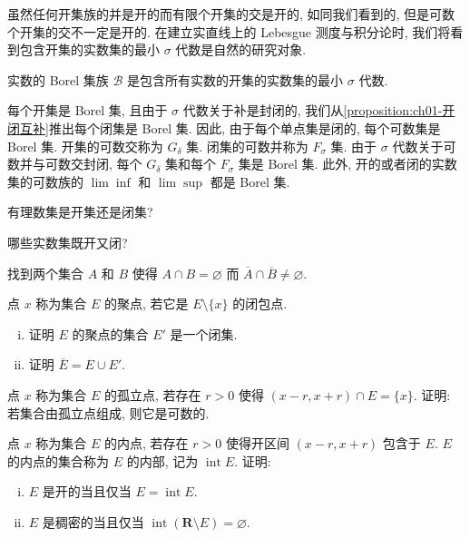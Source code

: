 \documentclass[../../main.tex]{subfiles}
\begin{document}
虽然任何开集族的并是开的而有限个开集的交是开的, 如同我们看到的, 但是可数个开集的交不一定是开的. 在建立实直线上的 Lebesgue 测度与积分论时, 我们将看到包含开集的实数集的最小 $\sigma$ 代数是自然的研究对象.

\begin{definition}[Borel 集族]\label{definition:ch01-Borel集}
实数的 Borel 集族 $\mathcal{B}$ 是包含所有实数的开集的实数集的最小 $\sigma$ 代数.
\end{definition}

每个开集是 Borel 集, 且由于 $\sigma$ 代数关于补是封闭的, 我们从\cref{proposition:ch01-开闭互补}推出每个闭集是 Borel 集. 因此, 由于每个单点集是闭的, 每个可数集是 Borel 集. 开集的可数交称为 $G_{\delta}$ 集. 闭集的可数并称为 $F_{\sigma}$ 集. 由于 $\sigma$ 代数关于可数并与可数交封闭, 每个 $G_{\delta}$ 集和每个 $F_{\sigma}$ 集是 Borel 集. 此外, 开的或者闭的实数集的可数族的 $\lim\inf$ 和 $\lim\sup$ 都是 Borel 集.

\begin{exercise}\label{exercise:ch01-27}
有理数集是开集还是闭集?
\end{exercise}

\begin{exercise}\label{exercise:ch01-28}
哪些实数集既开又闭?
\end{exercise}

\begin{exercise}\label{exercise:ch01-29}
找到两个集合 $A$ 和 $B$ 使得 $A\cap B=\varnothing$ 而 $\overline{A}\cap\overline{B}\neq\varnothing$.
\end{exercise}

\begin{exercise}\label{exercise:ch01-30}
点 $x$ 称为集合 $E$ 的聚点, 若它是 $E\setminus\{x\}$ 的闭包点.
\begin{enumerate}[(i)]
\item 证明 $E$ 的聚点的集合 $E'$ 是一个闭集.
\item 证明 $\overline{E}=E\cup E'$.
\end{enumerate}
\end{exercise}

\begin{exercise}\label{exercise:ch01-31}
点 $x$ 称为集合 $E$ 的孤立点, 若存在 $r>0$ 使得 $(x-r,x+r)\cap E=\{x\}$. 证明: 若集合由孤立点组成, 则它是可数的.
\end{exercise}

\begin{exercise}\label{exercise:ch01-32}
点 $x$ 称为集合 $E$ 的内点, 若存在 $r>0$ 使得开区间 $(x-r,x+r)$ 包含于 $E$. $E$ 的内点的集合称为 $E$ 的内部, 记为 $\operatorname{int}E$. 证明:
\begin{enumerate}[(i)]
\item $E$ 是开的当且仅当 $E=\operatorname{int}E$.
\item $E$ 是稠密的当且仅当 $\operatorname{int}(\mathbf{R}\setminus E)=\varnothing$.
\end{enumerate}
\end{exercise}
\end{document}
